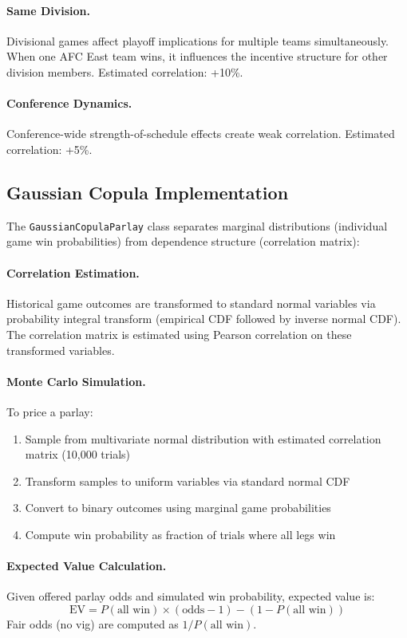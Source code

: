 \documentclass[12pt]{report}  %
\numberwithin{equation}{section}
\theoremstyle{plain}
\theoremstyle{definition}
\theoremstyle{remark}
\begin{document}
\paragraph{Same Division.}
Divisional games affect playoff implications for multiple teams simultaneously. When one AFC East team wins, it influences the incentive structure for other division members. Estimated correlation: +10\%.

\paragraph{Conference Dynamics.}
Conference-wide strength-of-schedule effects create weak correlation. Estimated correlation: +5\%.

\subsection{Gaussian Copula Implementation}
The \texttt{GaussianCopulaParlay} class separates marginal distributions (individual game win probabilities) from dependence structure (correlation matrix):

\paragraph{Correlation Estimation.}
Historical game outcomes are transformed to standard normal variables via probability integral transform (empirical CDF followed by inverse normal CDF). The correlation matrix is estimated using Pearson correlation on these transformed variables.

\paragraph{Monte Carlo Simulation.}
To price a parlay:
\begin{enumerate}
  \item Sample from multivariate normal distribution with estimated correlation matrix (10,000 trials)
  \item Transform samples to uniform variables via standard normal CDF
  \item Convert to binary outcomes using marginal game probabilities
  \item Compute win probability as fraction of trials where all legs win
\end{enumerate}

\paragraph{Expected Value Calculation.}
Given offered parlay odds and simulated win probability, expected value is:
\[
\text{EV} = P(\text{all win}) \times (\text{odds} - 1) - (1 - P(\text{all win}))
\]
Fair odds (no vig) are computed as $1 / P(\text{all win})$.
\end{document}
